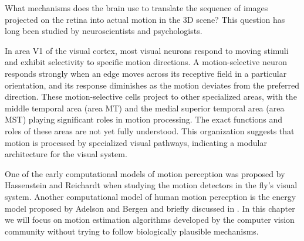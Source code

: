
What mechanisms does the brain use to translate the sequence of images projected on the retina into actual motion in the 3D scene? This question has long been studied by neuroscientists and psychologists.

In area V1 of the visual cortex, most visual neurons respond to moving stimuli and exhibit selectivity to specific motion directions. A motion-selective neuron responds strongly when an edge moves across its receptive field in a particular orientation, and its response diminishes as the motion deviates from the preferred direction. These motion-selective cells project to other specialized areas, with the middle temporal area (area MT) and the medial superior temporal area (area MST) playing significant roles in motion processing. The exact functions and roles of these areas are not yet fully understood. This organization suggests that motion is processed by specialized visual pathways, indicating a modular architecture for the visual system.

One of the early computational models of motion perception was proposed by Hassenstein and Reichardt \cite{hassenstein1956} when studying the motion detectors in the fly's visual system. Another computational model of human motion perception is the energy model proposed by Adelson and Bergen \cite{Adelson85} and briefly discussed in \chap{\ref{chapter:filter_banks}}. In this chapter we will focus on motion estimation algorithms developed by the computer vision community without trying to follow biologically plausible mechanisms. 



